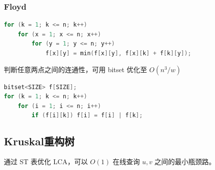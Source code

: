 \subsubsection{Floyd}

\begin{lstlisting}[language=C++]
for (k = 1; k <= n; k++)
    for (x = 1; x <= n; x++)
        for (y = 1; y <= n; y++)
            f[x][y] = min(f[x][y], f[x][k] + f[k][y]);
\end{lstlisting}

判断任意两点之间的连通性，可用 bitset 优化至 $O(n^3/w)$

\begin{lstlisting}[language=C++]
bitset<SIZE> f[SIZE];
for (k = 1; k <= n; k++)
    for (i = 1; i <= n; i++)
        if (f[i][k]) f[i] = f[i] | f[k];
\end{lstlisting}

\subsection{Kruskal重构树}

通过 ST 表优化 LCA，可以 $O(1)$ 在线查询 $u, v$ 之间的最小瓶颈路。

